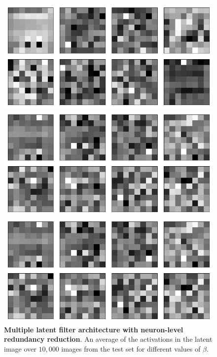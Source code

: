 \begin{figure}[h!]
\centering
\captionsetup{justification=centering}

    \includegraphics[scale=0.3]{figures/results/indiscriminate_decoupling/beta_1_average_activation.png}
    \caption{$\beta=1$}
    \includegraphics[scale=0.3]{figures/results/indiscriminate_decoupling/beta_4_average_activation.png}
    \caption{$\beta=4$}
    \includegraphics[scale=0.3]{figures/results/indiscriminate_decoupling/beta_4_average_activation.png}
    \caption{$\beta=32$}

\caption{\textbf{Multiple latent filter architecture with neuron-level redundancy reduction}. An average of the activations in the latent image over $10,000$ images from the test set for different values of $\beta$.}
\label{fig:indiscriminate_decoupling_average_filters}
\end{figure}






